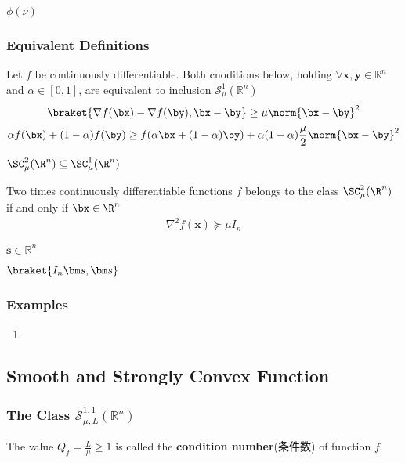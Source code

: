 $\phi(\nu)$

\subsubsection{Equivalent Definitions}

\begin{theorem}
    Let $f$ be continuously differentiable. Both cnoditions below, holding $\forall \bm x,\bm y\in\mathbb{R}^n$ and $\alpha \in [0,1]$, are equivalent to inclusion $\mathcal{S}_\mu^1(\mathbb{R}^n)$
    \begin{equation}
        \braket{\nabla f(\bx)-\nabla f(\by),\bx-\by}\ge\mu\norm{\bx-\by}^2
    \end{equation}
    \begin{equation}
        \alpha f(\bx)+(1-\alpha)f(\by)\ge f(\alpha \bx+(1-\alpha)\by)
        +\alpha(1-\alpha)\frac{\mu}{2}\norm{\bx-\by}^2
    \end{equation}
\end{theorem}

$\SC_\mu^2(\R^n)\subseteq \SC_\mu^1(\R^n)$
\begin{theorem}
    Two times continuously differentiable functions $f$ belongs to the class $\SC_\mu^2(\R^n)$ if and only if $\bx\in\R^n$
    \begin{align*}
        \nabla^2 f(\bm x)\succeq \mu I_n
    \end{align*}
\end{theorem}
$\bm s\in \mathbb{R}^n$

$\braket{I_n \bm s, \bm s}$

\subsubsection{Examples}
\begin{enumerate}
    \item 
\end{enumerate}

\subsection{Smooth and Strongly Convex Function}
\subsubsection{The Class \texorpdfstring{$\mathcal{S}_{\mu,L}^{1,1}(\mathbb{R}^n)$}. }

The value $Q_f=\frac{L}{\mu}\ge 1$ is called the \textbf{condition number}(条件数) of function $f$. 

